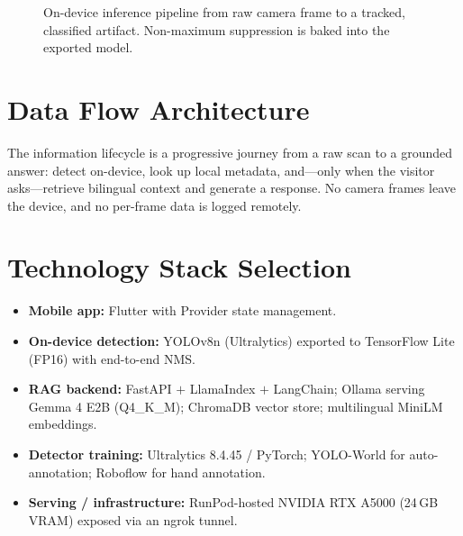 \begin{figure}[htbp]
\centering
{}
\caption{On-device inference pipeline from raw camera frame to a tracked, classified
artifact. Non-maximum suppression is baked into the exported model.}
\label{fig:infpipeline}
\end{figure}


\section{Data Flow Architecture}

The information lifecycle is a progressive journey from a raw scan to a grounded
answer: detect on-device, look up local metadata, and---only when the visitor
asks---retrieve bilingual context and generate a response. No camera frames leave the
device, and no per-frame data is logged remotely.

\section{Technology Stack Selection}

\begin{itemize}[leftmargin=1.5em]
  \item \textbf{Mobile app:} Flutter with Provider state management.
  \item \textbf{On-device detection:} YOLOv8n (Ultralytics) exported to TensorFlow Lite
        (FP16) with end-to-end NMS.
  \item \textbf{RAG backend:} FastAPI $+$ LlamaIndex $+$ LangChain; Ollama serving
        Gemma 4 E2B (Q4\_K\_M); ChromaDB vector store; multilingual MiniLM embeddings.
  \item \textbf{Detector training:} Ultralytics 8.4.45 / PyTorch; YOLO-World for
        auto-annotation; Roboflow for hand annotation.
  \item \textbf{Serving / infrastructure:} RunPod-hosted NVIDIA RTX A5000
        (24\,GB VRAM) exposed via an ngrok tunnel.
\end{itemize}

